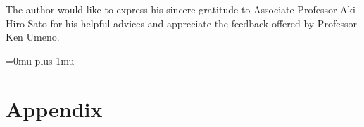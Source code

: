 \documentclass[dvipdfmx, english]{ampmt}             %
\begin{document}



\acknowledgment
The author would like to express his sincere gratitude to Associate Professor
Aki-Hiro Sato for his helpful advices and appreciate the feedback offered by Professor Ken Umeno.

\Urlmuskip=0mu plus 1mu\relax

\appendix

\section{Appendix}
\end{document}
